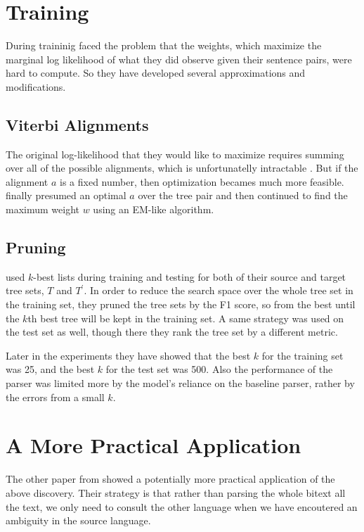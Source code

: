 \documentclass[11pt]{article} %
\begin{document}
\section{Training}

During traininig \cite{Burkett:2008:TLB:1613715.1613828} faced the problem that the weights, which maximize the marginal log likelihood of what they did observe given their sentence pairs, were hard to compute. So they have developed several approximations and modifications.

\subsection{Viterbi Alignments}

The original log-likelihood that they would like to maximize requires summing over all of the possible alignments, which is unfortunatelly intractable \citep{Valiant1979TheCO}. But if the alignment $a$ is a fixed number, then optimization becames much more feasible. \cite{Burkett:2008:TLB:1613715.1613828} finally presumed an optimal $a$ over the tree pair and then continued to find the maximum weight $w$ using an EM-like algorithm.

\subsection{Pruning}

\cite{Burkett:2008:TLB:1613715.1613828} used $k$-best lists during training and testing for both of their source and target tree sets, $T$ and $T^\prime$. In order to reduce the search space over the whole tree set in the training set, they pruned the tree sets by the F1 score, so from the best until the $k$th best tree will be kept in the training set. A same strategy was used on the test set as well, though there they rank the tree set by a different metric.

Later in the experiments they have showed that the best $k$ for the training set was 25, and the best $k$ for the test set was 500. Also the performance of the parser was limited more by the model's reliance on the baseline parser, rather by the errors from a small $k$.

\section{A More Practical Application}

The other paper from \cite{Huang:2009:BSP:1699648.1699668} showed a potentially more practical application of the above discovery. Their strategy is that rather than parsing the whole bitext all the text, we only need to consult the other language when we have encoutered an ambiguity in the source language.
\end{document}
